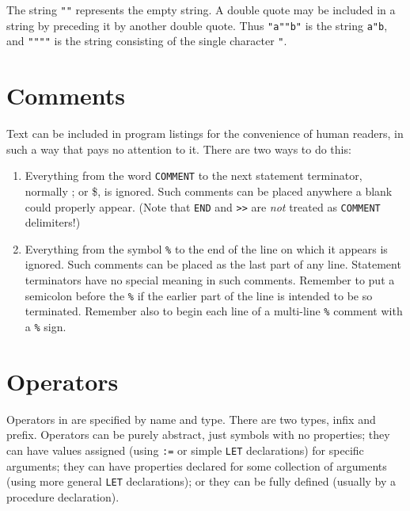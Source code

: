 The string \texttt{""} represents the empty string.  A double quote may be
included in a string by preceding it by another double quote.  Thus
\texttt{"a""b"} is the string \texttt{a"b}, and \texttt{""""} is the string
consisting of the single character \texttt{"}.

\hypertarget{comments}{\section{Comments}}

Text can be included in program listings for the
convenience of human readers, in such a way that {\REDUCE} pays no
attention to it.  There are two ways to do this:

\begin{enumerate}
\item Everything from the word \texttt{COMMENT} to the next
statement terminator, normally ; or \$, is ignored.  Such comments
can be placed anywhere a blank could properly appear. (Note that \texttt{END}
and \texttt{>}\texttt{>} are \emph{not} treated as \texttt{COMMENT} delimiters!)

\item Everything from the symbol \texttt{\%} to the end
of the line on which it appears is ignored.  Such comments can be placed
as the last part of any line.  Statement terminators have no special
meaning in such comments.  Remember to put a semicolon before the \texttt{\%}
if the earlier part of the line is intended to be so terminated.  Remember
also to begin each line of a multi-line \texttt{\%} comment with a \texttt{\%}
sign.
\end{enumerate}

\section{Operators}
\label{sec-operators}

Operators in {\REDUCE} are specified by name and type.
There are two types, infix and prefix.
  Operators can be purely abstract, just symbols
with no properties; they can have values assigned (using \texttt{:=} or
simple \texttt{LET} declarations) for specific arguments; they can have
properties declared for some collection of arguments (using more general
\texttt{LET} declarations); or they can be fully defined (usually by a
procedure declaration).

